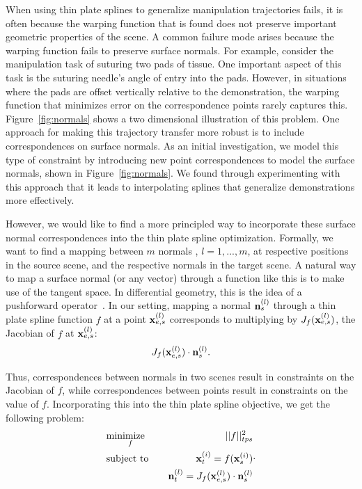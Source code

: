 When using thin plate splines to generalize manipulation trajectories fails, it is often because the warping function that is found does not preserve important geometric properties of the scene. A common failure mode arises because the warping function fails to preserve surface normals. For example, consider the manipulation task of suturing two pads of tissue. One important aspect of this task is the suturing needle's angle of entry into the pads. However, in situations where the pads are offset vertically relative to the demonstration, the warping function that minimizes error on the correspondence points rarely captures this. Figure~\ref{fig:normals} shows a two dimensional illustration of this problem. One approach for making this trajectory transfer more robust is to include correspondences on surface normals. As an initial investigation, we model this type of constraint by introducing new point correspondences to model the surface normals, shown in Figure~\ref{fig:normals}. We found through experimenting with this approach that it leads to interpolating splines that generalize demonstrations more effectively. 

However, we would like to find a more principled way to incorporate these surface normal correspondences into the thin plate spline optimization. Formally, we want to find a mapping between $m$ normals , $l=1,...,m$, at respective positions  in the source scene, and the respective normals  in the target scene. A natural way to map a surface normal (or any vector) through a function like this is to make use of the tangent space. In differential geometry, this is the idea of a pushforward operator~\cite{ralph1978foundations}. In our setting, mapping a normal $\mathbf{n}_s^{(l)}$ through a thin plate spline function $f$ at a point $\mathbf{x}_{e,s}^{(l)}$ corresponds to multiplying by $J_f(\mathbf{x}_{e,s}^{(l)})$, the Jacobian of $f$ at $\mathbf{x}_{e,s}^{(l)}$: $$J_f(\mathbf{x}_{e,s}^{(l)}) \cdot \mathbf{n}_s^{(l)}.$$  

Thus, correspondences between normals in two scenes result in constraints on the Jacobian of $f$, while correspondences between points result in constraints on the value of $f$. Incorporating this into the thin plate spline objective, we get the following problem:
\begin{equation}
\begin{align}
 &\underset{f}{\text{minimize\ \ \ }} & ||f||_{tps}^2 \\
 &\text{subject to\ \ \ }
 & \mathbf{x}_t^{(i)} = f(\mathbf{x}_s^{(i)}) \\
 && \mathbf{n}_t^{(l)}= J_f(\mathbf{x}_{e,s}^{(l)}) \cdot \mathbf{n}_s^{(l)}\\
\end{align}
.
\label{eq:tps_normals}
\end{equation}

